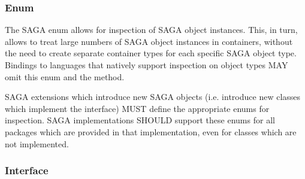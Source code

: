  \subsubsection*{Enum }
 
  The SAGA  enum allows for inspection of
  SAGA object instances.  This, in turn, allows to treat large
  numbers of SAGA object instances in containers, without the
  need to create separate container types for each specific SAGA
  object type.  Bindings to languages that natively support inspection on
  object types MAY omit this enum and the 
  method.
 
  SAGA extensions which introduce new SAGA objects (i.e.
  introduce new classes which implement the 
  interface) MUST define the appropriate  enums
  for inspection.  SAGA implementations SHOULD support these
  enums for all packages which are provided in that
  implementation, even for classes which are not implemented.
 
 
 \subsubsection*{Interface }
 
